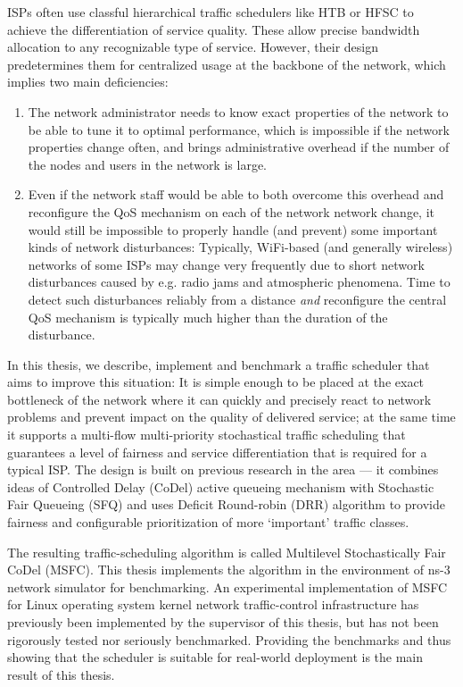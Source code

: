 ISPs often use classful hierarchical traffic schedulers like HTB or HFSC to achieve the differentiation of service quality. These allow precise bandwidth allocation to any recognizable type of service. However, their design predetermines them for centralized usage at the backbone of the network, which implies two main deficiencies:
\begin{enumerate}
\item The network administrator needs to know exact properties of the network to be able to tune it to optimal performance, which is impossible if the network properties change often, and brings administrative overhead if the number of the nodes and users in the network is large.
\item Even if the network staff would be able to both overcome this overhead and reconfigure the QoS mechanism on each of the network network change, it would still be impossible to properly handle (and prevent) some important kinds of network disturbances: Typically, WiFi-based (and generally wireless) networks of some ISPs may change very frequently due to short network disturbances caused by e.g. radio jams and atmospheric phenomena. Time to detect such disturbances reliably from a distance \emph{and} reconfigure the central QoS mechanism is typically much higher than the duration of the disturbance.
\end{enumerate}

In this thesis, we describe, implement and benchmark a traffic scheduler that aims to improve this situation: It is simple enough to be placed at the exact bottleneck of the network where it can quickly and precisely react to network problems and prevent impact on the quality of delivered service; at the same time it supports a multi-flow multi-priority stochastical traffic scheduling that guarantees a level of fairness and service differentiation that is required for a typical ISP. The design is built on previous research in the area --- it combines ideas of Controlled Delay (CoDel) active queueing mechanism with Stochastic Fair Queueing (SFQ) and uses Deficit Round-robin (DRR) algorithm to provide fairness and configurable prioritization of more `important' traffic classes. 

The resulting traffic-scheduling algorithm is called Multilevel Stochastically Fair CoDel (MSFC). This thesis implements the algorithm in the environment of ns-3 network simulator  for benchmarking. An experimental implementation of MSFC for Linux operating system kernel network traffic-control infrastructure has previously been implemented by the supervisor of this thesis, but has not been rigorously tested nor seriously benchmarked. Providing the benchmarks and thus showing that the scheduler is suitable for real-world deployment is the main result of this thesis.


